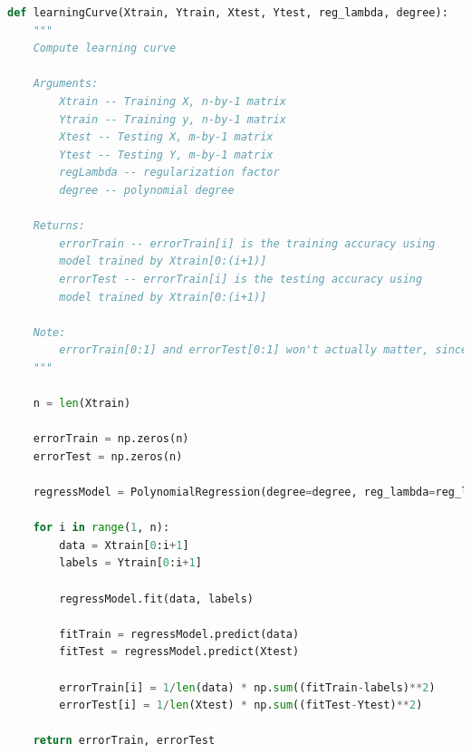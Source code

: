 \documentclass{article}
\newcommand{\1}{\mathbf{1}}
\begin{document}
\begin{lstlisting}[language=Python]
def learningCurve(Xtrain, Ytrain, Xtest, Ytest, reg_lambda, degree):
    """
    Compute learning curve

    Arguments:
        Xtrain -- Training X, n-by-1 matrix
        Ytrain -- Training y, n-by-1 matrix
        Xtest -- Testing X, m-by-1 matrix
        Ytest -- Testing Y, m-by-1 matrix
        regLambda -- regularization factor
        degree -- polynomial degree

    Returns:
        errorTrain -- errorTrain[i] is the training accuracy using
        model trained by Xtrain[0:(i+1)]
        errorTest -- errorTrain[i] is the testing accuracy using
        model trained by Xtrain[0:(i+1)]

    Note:
        errorTrain[0:1] and errorTest[0:1] won't actually matter, since we start displaying the learning curve at n = 2 (or higher)
    """

    n = len(Xtrain)

    errorTrain = np.zeros(n)
    errorTest = np.zeros(n)

    regressModel = PolynomialRegression(degree=degree, reg_lambda=reg_lambda)

    for i in range(1, n):
        data = Xtrain[0:i+1]
        labels = Ytrain[0:i+1]

        regressModel.fit(data, labels)

        fitTrain = regressModel.predict(data)
        fitTest = regressModel.predict(Xtest)

        errorTrain[i] = 1/len(data) * np.sum((fitTrain-labels)**2)
        errorTest[i] = 1/len(Xtest) * np.sum((fitTest-Ytest)**2)

    return errorTrain, errorTest
\end{lstlisting}
\end{document}
